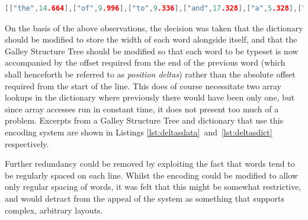 \begin{lstlisting}[label=lst:deltasdict,captionpos=b,float,language=c,stringstyle=\color{blue},basicstyle=\ttfamily\footnotesize,caption={[Excerpt from a dictionary storing word widths]Excerpt from the dictionary from a JavaScript data file that uses position deltas, where the width of each word is stored alongside the word itself.}]
 [["the",14.664],["of",9.996],["to",9.336],["and",17.328],["a",5.328],["is",8.004],["be",11.328],["in",9.336],["as",9.996],["document",47.328],["that",18],["it",6.672],["page",22.656],["for",13.992],["are",14.652],["by",12],["on",12],["will",18.672],["which",29.328],["with",21.336],["this",17.34],["The",18.66],["can",16.656],["an",11.328],["or",9.996],["-",3.996],["eBook",31.332],["used",21.996],["PDF",22.008],["In",9.996],["layout",30],["have",22.656],["from",23.328],["not",15.336],["at",8.664],["width",27.336],["This",21.336],["has",15.996],["then",20.664],["each",21.984],["was",18.66],["typesetting",52.668],["columns",40.668],["simply",32.676],["these",24.66],["text",18],["into",18.672],["hyphenation",59.328],["content",35.328],["quality",33.336],["column",36],["lines",22.668],["only",21.336],["line",18],["ACM",27.336],["our",15.996],["its",11.34],["structure",41.988],["Document",49.992],["penalty",35.328],["between",39.984],["galley",29.328],["order",25.32],["more",24.66],["COGs",30],["out",15.336],["end",17.328],["one",17.328],["use",15.996],["algorithm",46.668],["producing",48.66],["columns.",43.668],["galleys",33.996],["figure",28.656],["simple",32.004],["would",30],
\end{lstlisting}

On the basis of the above observations, the decision was taken that the dictionary should be modified to store the width of each word alongside itself, and that the Galley Structure Tree should be modified so that each word to be typeset is now accompanied by the offset required from the end of the previous word (which shall henceforth be referred to as \emph{position deltas}) rather than the absolute offset required from the start of the line. This does of course necessitate two array lookups in the dictionary where previously there would have been only one, but since array accesses run in constant time, it does not present too much of a problem. Excerpts from a Galley Structure Tree and dictionary that use this encoding system are shown in Listings \ref{lst:deltasdata}~and~\ref{lst:deltasdict} respectively.

Further redundancy could be removed by exploiting the fact that words tend to be regularly spaced on each line. Whilst the encoding could be modified to allow only regular spacing of words, it was felt that this might be somewhat restrictive, and would detract from the appeal of the system as something that supports complex, arbitrary layouts.

